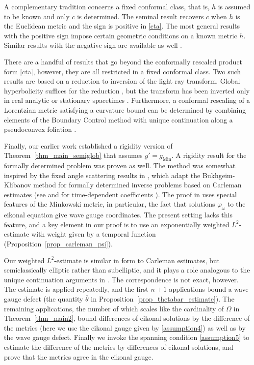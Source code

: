 \documentclass[11pt,letterpaper]{amsart}
\theoremstyle{definition}
\numberwithin{equation}{section}
\newcommand{\ol}[1]{\overline{#1}}
\newcommand{\gm}{g_{\mathrm{Min}}}
\begin{document}
A complementary tradition concerns a fixed conformal class, that is, $h$ is assumed to be known and only $c$ is determined. The seminal result \cite{sylvester1987} recovers $c$ when $h$ is the Euclidean metric and the sign is positive in \eqref{cta}. The most general results with the positive sign \cite{dos-santos-ferreira2009,dos-santos-ferreira2016,carstea2023} impose certain geometric conditions on a known metric $h$. Similar results with the negative sign are available as well \cite{kian2019a, feizmohammadi2021b}. 

There are a handful of results that go beyond the conformally rescaled product form \eqref{cta}, however, they are all restricted in a fixed conformal class. Two such results are based on a reduction to inversion of the light ray transform. Global hyperbolicity suffices for the reduction \cite{stefanov2018}, but the transform has been inverted only in real analytic or stationary spacetimes \cite{stefanov2017, oksanen2025b}. Furthermore, a conformal rescaling of a Lorentzian metric satisfying a curvature bound can be determined by combining elements of the Boundary Control method with unique continuation along a pseudoconvex foliation \cite{alexakisfeizmohammadioksanen2022}. 

Finally, our earlier work \cite{oksanen2024} established a rigidity version of Theorem~\ref{thm_main_semiglob} that assumes $g' = \gm$. A rigidity result for the formally determined problem was proven as well. The method was somewhat inspired by the fixed angle scattering results in \cite{rakesh2020a, rakesh2020b}, which adapt the Bukhgeim-Klibanov method for formally determined inverse problems based on Carleman estimates (see \cite{bukhgeim1981, bellassoued2017, klibanov2021} and for time-dependent coefficients \cite{takase2023}). The proof in \cite{oksanen2024} uses special features of the Minkowski metric, in particular, the fact that solutions $\varphi_{\omega}$ to the eikonal equation give wave gauge coordinates. The present setting lacks this feature, and a key element in our proof is to use an exponentially weighted $L^2$-estimate with weight given by a temporal function (Proposition~\ref{prop_carleman_psi}).

Our weighted $L^2$-estimate is similar in form to Carleman estimates, but semiclassically elliptic rather than subelliptic, and it plays a role analogous to the unique continuation arguments in \cite{oksanen2024}. The correspondence is not exact, however. The estimate is applied repeatedly, and the first $n+1$ applications bound a wave gauge defect (the quantity $\ol \theta$ in Proposition~\ref{prop_thetabar_estimate}). The remaining applications, the number of which scales like the cardinality of $\Omega$ in Theorem~\ref{thm_main2}, 
bound differences of eikonal solutions by the difference of the metrics (here we use the eikonal gauge given by \eqref{assumption4}) as well as by the wave gauge defect. Finally we invoke the spanning condition \eqref{assumption5} to estimate the difference of the metrics by differences of eikonal solutions, and prove that the metrics agree in the eikonal gauge.
\end{document}
